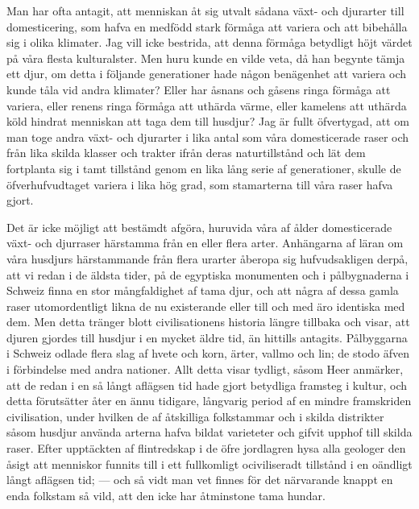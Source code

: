 Man har ofta antagit, att menniskan åt sig utvalt sådana växt- och djurarter till domesticering, som hafva en medfödd stark förmåga att variera och att bibehålla sig i olika klimater. Jag vill icke bestrida, att denna förmåga betydligt höjt värdet på våra flesta kulturalster. Men huru kunde en vilde veta, då han begynte tämja ett djur, om detta i följande generationer hade någon benägenhet att variera och kunde tåla vid andra klimater? Eller har åsnans och gåsens ringa förmåga att variera, eller renens ringa förmåga att uthärda värme, eller kamelens att uthärda köld hindrat menniskan att taga dem till husdjur? Jag är fullt öfvertygad, att om man toge andra växt- och djurarter i lika antal som våra domesticerade raser och från lika skilda klasser och trakter ifrån deras naturtillstånd och lät dem fortplanta sig i tamt tillstånd genom en lika lång serie af generationer, skulle de öfverhufvudtaget variera i lika hög grad, som stamarterna till våra raser hafva gjort.

Det är icke möjligt att bestämdt afgöra, huruvida våra af ålder domesticerade växt- och djurraser härstamma från en eller flera arter. Anhängarna af läran om våra husdjurs härstammande från flera urarter åberopa sig hufvudsakligen derpå, att vi redan i de äldsta tider, på de egyptiska monumenten och i pålbygnaderna i Schweiz finna en stor mångfaldighet af tama djur, och att några af dessa gamla raser utomordentligt likna de nu existerande eller till och med äro identiska med dem. Men detta tränger blott civilisationens historia längre tillbaka och visar, att djuren gjordes till husdjur i en mycket äldre tid, än hittills antagits. Pålbyggarna i Schweiz odlade flera slag af hvete och korn, ärter, vallmo och lin; de stodo äfven i förbindelse med andra nationer. Allt detta visar tydligt, såsom Heer anmärker, att de redan i en så långt aflägsen tid hade gjort betydliga framsteg i kultur, och detta förutsätter åter en ännu tidigare, långvarig period af en mindre framskriden civilisation, under hvilken de af åtskilliga folkstammar och i skilda distrikter såsom husdjur använda arterna hafva bildat varieteter och gifvit upphof till skilda raser. Efter upptäckten af flintredskap i de öfre jordlagren hysa alla geologer den åsigt att menniskor funnits till i ett fullkomligt ociviliseradt tillstånd i en oändligt långt aflägsen tid; — och så vidt man vet finnes för det närvarande knappt en enda folkstam så vild, att den icke har åtminstone tama hundar.

